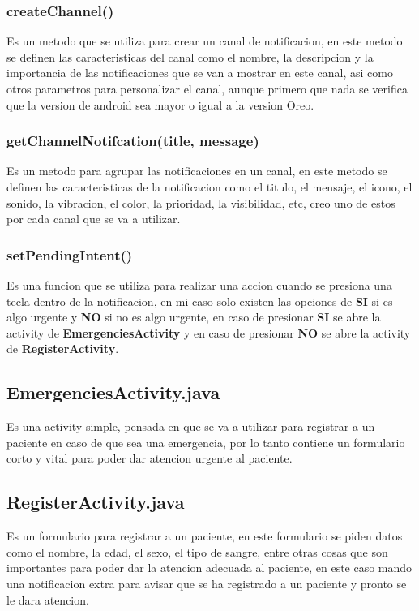 \documentclass{article}
\begin{document}
\subsubsection{createChannel()}
Es un metodo que se utiliza para crear un canal de notificacion, en este metodo
se definen las caracteristicas del canal como el nombre, la descripcion y la
importancia de las notificaciones que se van a mostrar en este canal, asi como
otros parametros para personalizar el canal, aunque primero que nada se verifica
que la version de android sea mayor o igual a la version Oreo.

\subsubsection{getChannelNotifcation(title, message)}
Es un metodo para agrupar las notificaciones en un canal, en este metodo se
definen las caracteristicas de la notificacion como el titulo, el mensaje, el
icono, el sonido, la vibracion, el color, la prioridad, la visibilidad, etc, creo
uno de estos por cada canal que se va a utilizar.

\subsubsection{setPendingIntent()}
Es una funcion que se utiliza para realizar una accion cuando se presiona una
tecla dentro de la notificacion, en mi caso solo existen las opciones de
\textbf{SI} si es algo urgente y \textbf{NO} si no es algo urgente, en caso de
presionar \textbf{SI} se abre la activity de \textbf{EmergenciesActivity} y en
caso de presionar \textbf{NO} se abre la activity de \textbf{RegisterActivity}.

\subsection{EmergenciesActivity.java}
Es una activity simple, pensada en que se va a utilizar para registrar a
un paciente en caso de que sea una emergencia, por lo tanto contiene
un formulario corto y vital para poder dar atencion urgente al paciente.

\subsection{RegisterActivity.java}
Es un formulario para registrar a un paciente, en este formulario se piden
datos como el nombre, la edad, el sexo, el tipo de sangre, entre otras cosas
que son importantes para poder dar la atencion adecuada al paciente, en este
caso mando una notificacion extra para avisar que se ha registrado a un paciente
y pronto se le dara atencion.
\end{document}
